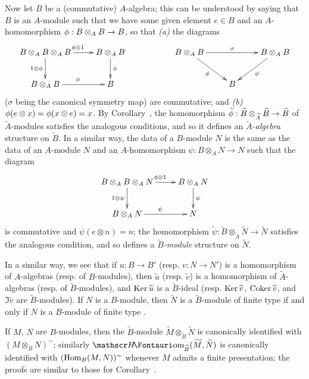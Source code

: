 \begin{env}[1.3.13]
\label{I.1.3.13}
Now let $B$ be a (commutative) $A$-algebra; this can be understood by saying that $B$ is an $A$-module such that we have some given element $e\in B$ and an $A$-homomorphism $\vphi:B\otimes_A B\to B$, so that \emph{(a)} the diagrams
\[
  \xymatrix{
    B\otimes_A B\otimes_A B\ar[r]^{\vphi\otimes 1}\ar[d]_{1\otimes\vphi} &
    B\otimes_A B\ar[d]^\vphi & &
    B\otimes_A B\ar[rr]^\sigma\ar[rd]_\vphi & &
    B\otimes_A B\ar[dl]^\vphi\\
    B\otimes_A B\ar[r]^\vphi &
    B & & &
    B
  }
\]
($\sigma$ being the canonical symmetry map) are commutative; and \emph{(b)} $\phi(e\otimes x)=\phi(x\otimes e)=x$.
By Corollary~, the homomorphism $\widetilde{\vphi}:\widetilde{B}\otimes_{\widetilde{A}}\widetilde{B}\to\widetilde{B}$ of $\widetilde{A}$-modules satisfies the analogous conditions, and so it defines an \emph{$\widetilde{A}$-algebra} structure on $\widetilde{B}$.
In a similar way, the data of a $B$-module $N$ is the same as the data of an $A$-module $N$ and an $A$-homomorphism $\psi:B\otimes_A N\to N$ such that the diagram
\[
  \xymatrix{
    B\otimes_A B\otimes_A N\ar[r]^{\vphi\otimes 1}\ar[d]_{1\otimes\psi} &
    B\otimes_A N\ar[d]^\psi\\
    B\otimes_A N\ar[r]^\psi &
    N
  }
\]
is commutative and $\psi(e\otimes n)=n$;
the homomorphism $\widetilde{\psi}:\widetilde{B}\otimes_{\widetilde{A}}\widetilde{N}\to\widetilde{N}$ satisfies the analogous condition, and so defines a \emph{$\widetilde{B}$-module} structure on $\widetilde{N}$.

In a similar way, we see that if $u:B\to B'$ (resp. $v:N\to N'$) is a homomorphism of $A$-algebras (resp. of $B$-modules), then $\widetilde{u}$ (resp. $\widetilde{v}$) is a homomorphism of $\widetilde{A}$-algebras (resp. of $\widetilde{B}$-modules), and $\operatorname{Ker}\widetilde{u}$ is a $\widetilde{B}$-ideal (resp. $\operatorname{Ker}\widetilde{v}$, $\operatorname{Coker}\widetilde{v}$, and $\Im\widetilde{v}$ are $\widetilde{B}$-modules).
If $N$ is a $B$-module, then $\widetilde{N}$ is a $\widetilde{B}$-module of finite type if and only if $N$ is a $B$-module of finite type .

If $M$, $N$ are $B$-modules, then the $\widetilde{B}$-module $\widetilde{M}\otimes_{\widetilde{B}}\widetilde{N}$ is canonically identified with $(M\otimes_B N)^\sim$;
similarly $\shHom_{\widetilde{B}}(\widetilde{M},\widetilde{N})$ is canonically identified with $(\operatorname{Hom}_B(M,N))^\sim$ whenever $M$ admits a finite presentation;
the proofs are similar to those for Corollary~.


\end{env}
